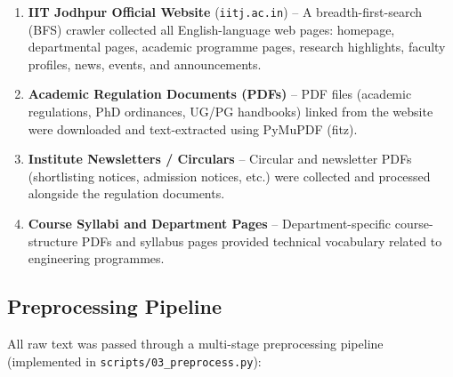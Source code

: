 \documentclass[12pt,a4paper]{article}
\begin{document}
\begin{enumerate}[leftmargin=1.4em]
    \item \textbf{IIT Jodhpur Official Website} (\texttt{iitj.ac.in}) --
          A breadth-first-search (BFS) crawler collected all English-language
          web pages: homepage, departmental pages, academic programme pages,
          research highlights, faculty profiles, news, events, and
          announcements.

    \item \textbf{Academic Regulation Documents (PDFs)} -- PDF files
          (academic regulations, PhD ordinances, UG/PG handbooks) linked
          from the website were downloaded and text-extracted using
          PyMuPDF (fitz).

    \item \textbf{Institute Newsletters / Circulars} -- Circular and
          newsletter PDFs (shortlisting notices, admission notices, etc.)
          were collected and processed alongside the regulation documents.

    \item \textbf{Course Syllabi and Department Pages} -- Department-specific
          course-structure PDFs and syllabus pages provided technical
          vocabulary related to engineering programmes.
\end{enumerate}

\subsection{Preprocessing Pipeline}

All raw text was passed through a multi-stage preprocessing pipeline
(implemented in \texttt{scripts/03\_preprocess.py}):
\end{document}

